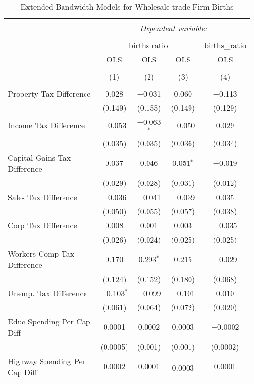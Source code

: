 
\begin{table}[!htbp] \centering 
  \caption{Extended Bandwidth Models for  Wholesale trade Firm Births} 
  \label{42eb} 
\begin{tabular}{@{\extracolsep{5pt}}lcccc} 
\\[-1.8ex]\hline 
\hline \\[-1.8ex] 
 & \multicolumn{4}{c}{\textit{Dependent variable:}} \\ 
\cline{2-5} 
\\[-1.8ex] & \multicolumn{3}{c}{births ratio} & births\_ratio \\ 
 & OLS & OLS & OLS & OLS \\ 
\\[-1.8ex] & (1) & (2) & (3) & (4)\\ 
\hline \\[-1.8ex] 
 Property Tax Difference & 0.028 & $-$0.031 & 0.060 & $-$0.113 \\ 
  & (0.149) & (0.155) & (0.149) & (0.129) \\ 
  Income Tax Difference & $-$0.053 & $-$0.063$^{*}$ & $-$0.050 & 0.029 \\ 
  & (0.035) & (0.035) & (0.036) & (0.034) \\ 
  Capital Gains Tax Difference & 0.037 & 0.046 & 0.051$^{*}$ & $-$0.019 \\ 
  & (0.029) & (0.028) & (0.031) & (0.012) \\ 
  Sales Tax Difference & $-$0.036 & $-$0.041 & $-$0.039 & 0.035 \\ 
  & (0.050) & (0.055) & (0.057) & (0.038) \\ 
  Corp Tax Difference & 0.008 & 0.001 & 0.003 & $-$0.035 \\ 
  & (0.026) & (0.024) & (0.025) & (0.025) \\ 
  Workers Comp Tax Difference & 0.170 & 0.293$^{*}$ & 0.215 & $-$0.029 \\ 
  & (0.124) & (0.152) & (0.180) & (0.068) \\ 
  Unemp. Tax Difference & $-$0.103$^{*}$ & $-$0.099 & $-$0.101 & 0.010 \\ 
  & (0.061) & (0.064) & (0.072) & (0.020) \\ 
  Educ Spending Per Cap Diff & 0.0001 & 0.0002 & 0.0003 & $-$0.0002 \\ 
  & (0.0005) & (0.001) & (0.001) & (0.0002) \\ 
  Highway Spending Per Cap Diff & 0.0002 & 0.0001 & $-$0.0003 & 0.0001 \\ 

\end{tabular}
\end{table}
